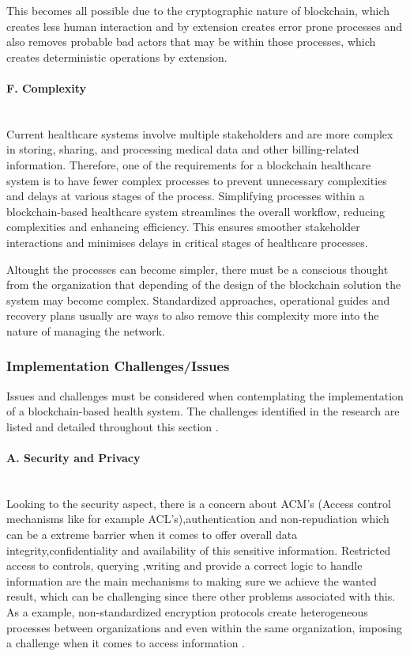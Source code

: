 This becomes all possible due to the cryptographic nature of blockchain, which creates less human interaction and 
by extension creates error prone processes and also removes probable bad actors that may be within those processes, which creates 
deterministic operations by extension.
\paragraph{F. Complexity} \mbox{}\\
Current healthcare systems involve multiple stakeholders and are more complex in storing, sharing, and processing medical data and other 
billing-related information. Therefore, one of the requirements for a blockchain healthcare system is to have fewer complex processes to 
prevent unnecessary complexities and delays at various stages of the process.
Simplifying processes within a blockchain-based healthcare system streamlines the overall workflow, reducing complexities and enhancing
efficiency. This ensures smoother stakeholder interactions and minimises delays in critical stages of healthcare processes.

Altought the processes can become simpler, there must be a conscious thought from the organization that depending of the design of 
the blockchain solution the system may become complex. Standardized approaches, operational guides and recovery plans usually 
are ways to also remove this complexity more into the nature of managing the network.

\subsubsection{Implementation Challenges/Issues} 
Issues and challenges must be considered when contemplating the implementation of a blockchain-based health system. The challenges 
identified in the research are listed and detailed throughout this section \cite{blockchain-utilization-in-healthcare}.

\paragraph{A. Security and Privacy} \mbox{}\\
Looking to the security aspect, there is a concern about ACM's (Access control mechanisms like for example ACL's),authentication 
and non-repudiation which can be a extreme barrier when it comes to offer overall data integrity,confidentiality and availability of 
this sensitive information. Restricted access to controls, querying ,writing and provide a correct logic to handle information are 
the main mechanisms to making sure we achieve the wanted result, which can be challenging since there other problems associated with 
this. As a example, non-standardized encryption protocols create heterogeneous processes between organizations and even within the same 
organization, imposing a challenge when it comes to access information \cite{med-rec}.

